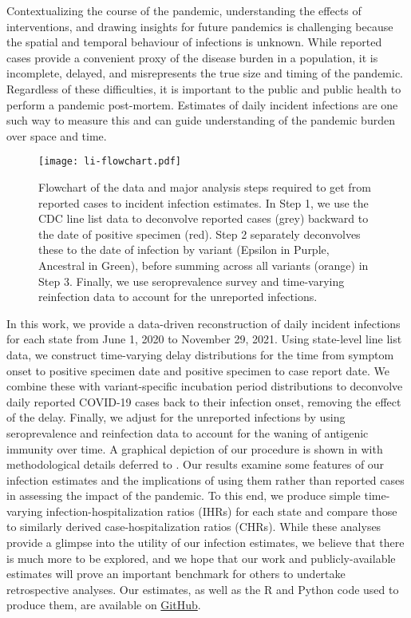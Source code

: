 Contextualizing the course of the pandemic, understanding the effects of
interventions, and drawing insights for future pandemics is challenging because
the spatial and temporal behaviour of infections is unknown. While reported
cases provide a convenient proxy of the disease burden in a population, it is
incomplete, delayed, and misrepresents the true size and timing of the pandemic.
Regardless of these difficulties, it is important to the public and public
health to perform a pandemic post-mortem. Estimates of daily incident infections
are one such way to measure this and can guide understanding of the pandemic
burden over space and time. 

\begin{figure}[!b]
\centering
    \texttt{[image: li-flowchart.pdf]} 
    \caption{Flowchart of the data and major analysis steps required to get from
    reported cases to incident infection estimates. In Step 1, we use the CDC
    line list data to deconvolve reported cases (grey) backward to the date of
    positive specimen (red). Step 2 separately deconvolves these to the date of
    infection by variant (Epsilon in Purple, Ancestral in Green), 
    before summing across all variants (orange)
    in Step 3. Finally, we use seroprevalence
    survey and time-varying reinfection data to account for the unreported
    infections.}
    \label{fig:cases_to_infect_flowchart}
\end{figure}
    

In this work, we provide a data-driven reconstruction of daily incident
infections for each \US state from June 1, 2020 to November 29, 2021. Using
state-level line list data, we construct time-varying delay distributions for
the time from symptom onset to positive specimen date and positive specimen to
case report date. We combine these with variant-specific incubation period
distributions to deconvolve daily reported COVID-19 cases back to their
infection onset, removing the effect of the delay. Finally, we adjust for the
unreported infections by using seroprevalence and reinfection data to account
for the waning of antigenic immunity over time. A graphical depiction of our
procedure is shown in  with methodological
details deferred to . Our results examine some features of our
infection estimates and the implications of using them rather than reported
cases in assessing the impact of the pandemic. To this end, we produce simple
time-varying infection-hospitalization ratios (IHRs) for each state and compare
those to similarly derived case-hospitalization ratios (CHRs). While these
analyses provide a glimpse into the utility of our infection estimates, we
believe that there is much more to be explored, and we hope that our work and
publicly-available estimates will prove an important benchmark for others to
undertake retrospective analyses. Our estimates, as well as the R and Python
code used to produce them, are available on
\href{https://github.com/cmu-delphi/latent-infections/}{GitHub}.

